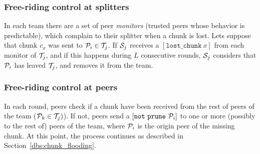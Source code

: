 \begin{comment}
\subsubsection{Generation of the routing tables}
Routing tables has as many entries as peers are in the team. The
routing table of a peer $P_i$ is a dictionary of pairs ($d(P_i, P_j)$,
$P_k$) indexed by the destination peer $P_j$ is a destination peer,
where $d(P_i, P_j)$ is the last measurement of the number of hops (in
peers) between $P_i$ and $P_j$, and $P_k\in N(P_i)$ is the 1-hop peer
that in the shortest-path between $P_i$ and $P_j$. Notice that if
$P_j==P_k$ then $d(P_i, P_j)==1$, which means that $P_i$ and $P_j$ are
directly ``connected''.

When a peer has updated its routing table, it is sent to their
neighbors pyggibacked on a \textsf{chunk} packet. When a peer receives
a routing table, it keeps a copy of it and updates its own routing
table with the new routing information using the Bellman-Ford
Algorithm~\cite{}. The peers have a copy of the routing table of its
neighbors to use it through the chunk routing process (see
Rule~\cite{the_routing_process}.
\end{comment}

\subsubsection{Free-riding control at splitters}
\label{dbs:frcS}
In each team there are a set of peer \emph{monitors} (trusted peers
whose behavior is predictable), which complain to their splitter when
a chunk is lost. Lets suppose that chunk $c_x$ was sent to ${\cal
  P}_i\in {\cal T}_j$. If ${\cal S}_j$ receives a
$[\mathtt{lost\_chunk}~x]$ from each monitor of ${\cal T}_j$, and if
this happens during $L$ consecutive rounds, ${\cal S}_j$ considers
that ${\cal P}_i$ has leaved ${\cal T}_j$, and removes it from the
team.

\subsubsection{Free-riding control at peers} %
\label{dbs:frcp}
In each round, peers check if a chunk have been received from the rest
of peers of the team (${\cal P}_k\in {\cal T}_j)$). If not, peers send
a $[\mathtt{not~prune}~{\cal P}_i]$ to one or more (possibly
to the rest of) peers of the team, where ${\cal P}_i$ is the origin peer
of the missing chunk. At this point, the process continues as
described in Section~\ref{dbs:chunk_flooding}.

